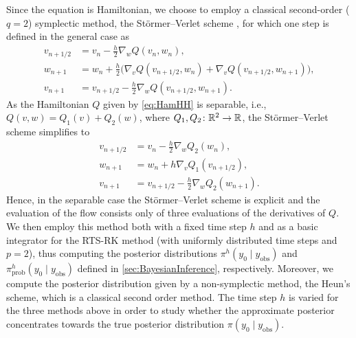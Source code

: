 \documentclass[10pt]{article}
\begin{document}
Since the equation is Hamiltonian, we choose to employ a classical second-order ($q = 2$) symplectic method, the Störmer--Verlet scheme \cite{Sto07, Ver67, HLW06}, for which one step is defined in the general case as
\begin{equation}
\begin{aligned}
v_{n+1/2} &= v_n - \frac{h}{2} \nabla_w Q(v_n, w_n), \\
w_{n+1} &= w_n + \frac{h}{2} \big(\nabla_v Q(v_{n+1/2}, w_n) + \nabla_v Q(v_{n+1/2}, w_{n+1})\big),\\
v_{n+1} &= v_{n+1/2} - \frac{h}{2} \nabla_w Q(v_{n+1/2}, w_{n+1}).
\end{aligned}
\end{equation}
As the Hamiltonian $Q$ given by \eqref{eq:HamHH} is separable, i.e., $Q(v, w) = Q_1(v) + Q_2(w)$, where $Q_1, Q_2 \colon \mathbb{R}^2 \to \mathbb{R}$, the Störmer--Verlet scheme simplifies to
\begin{equation}
\begin{aligned}
v_{n+1/2} &= v_n - \frac{h}{2} \nabla_w Q_2(w_n), \\
w_{n+1} &= w_n + h \nabla_v Q_1(v_{n+1/2}),\\
v_{n+1} &= v_{n+1/2} - \frac{h}{2} \nabla_w Q_2(w_{n+1}).
\end{aligned}
\end{equation}
Hence, in the separable case the Störmer--Verlet scheme is explicit and the evaluation of the flow consists only of three evaluations of the derivatives of $Q$. We then employ this method both with a fixed time step $h$ and as a basic integrator for the RTS-RK method (with uniformly distributed time steps and $p = 2$), thus computing the posterior distributions $\pi^h(y_0 \mid y_{\mathrm{obs}})$ and $\pi^h_{\mathrm{prob}}(y_0 \mid y_{\mathrm{obs}})$ defined in \cref{sec:BayesianInference}, respectively. Moreover, we compute the posterior distribution given by a non-symplectic method, the Heun's scheme, which is a classical second order method. The time step $h$ is varied for the three methods above in order to study whether the approximate posterior concentrates towards the true posterior distribution $\pi(y_0 \mid y_{\mathrm{obs}})$.
\end{document}

